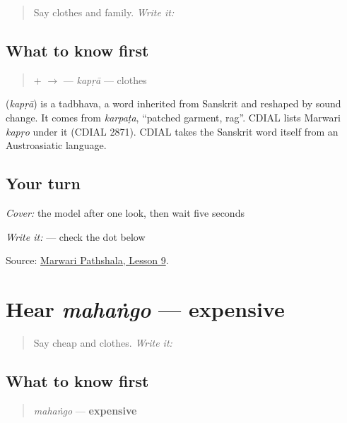 \begin{quote}
Say clothes and family. \emph{Write it:} \textbf{}
\end{quote}

\subsection*{What to know first}
\begin{quote}
\textbf{} + \textbf{} $\to$ \textbf{} — \emph{kapṛā} — clothes
\end{quote}

\begin{cousinweb}
\textbf{} (\emph{kapṛā}) is a tadbhava, a word inherited from Sanskrit and reshaped by sound change. It comes from \emph{karpaṭa}, \textquotedblleft{}patched garment, rag\textquotedblright{}. CDIAL lists Marwari \emph{kapṛo} under it (CDIAL 2871). CDIAL takes the Sanskrit word itself from an Austroasiatic language.
\end{cousinweb}

\subsection*{Your turn}
\emph{Cover:} the model after one look, then wait five seconds

\emph{Write it:} \textbf{} — check the dot below \textbf{}

\begin{tcolorbox}[breakable,colback=teal!4,colframe=teal!35!black,title={Before you move on}]
Source: \href{https://www.marwaripathshala.com/marwari-lesson-9-english}{Marwari Pathshala, Lesson 9}.
\end{tcolorbox}
\section[mahaṅgo]{Hear \emph{mahaṅgo} — expensive}

\label{lesson:MW-C15-hear-mahango}



\begin{quote}
Say cheap and clothes. \emph{Write it:} \textbf{}
\end{quote}

\subsection*{What to know first}
\begin{quote}
\emph{mahaṅgo} — \textbf{expensive}
\end{quote}

